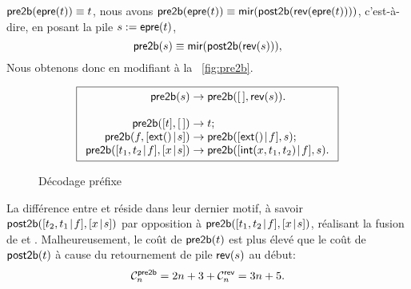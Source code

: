 \(\textsf{pre2b}(\textsf{epre}(t)) \equiv t\), nous avons
\(\textsf{pre2b}(\textsf{epre}(t)) \equiv
\textsf{mir}(\textsf{post2b}(\textsf{rev}(\textsf{epre}(t))))\), c'est-à-dire, en
posant la pile \(s := \textsf{epre}(t)\),
\begin{equation*}
\abovedisplayskip=7pt
\belowdisplayskip=7pt
\fun{pre2b}(s) \equiv \fun{mir}(\fun{post2b}(\fun{rev}(s))),
\end{equation*}
Nous obtenons donc
 en modifiant
 à la
\fig~\vref{fig:pre2b}.
\begin{figure}
\begin{equation*}
\boxed{
\begin{array}{r@{\;}c@{\;}l}
\fun{pre2b}(s) & \rightarrow & \fun{pre2b}(\el,\fun{rev}(s)).\\
\\
\fun{pre2b}([t],\el) & \rightarrow & t;\\
\fun{pre2b}(f,\cons{\fun{ext}()}{s}) & \rightarrow & \fun{pre2b}(\cons{\fun{ext}()}{f},s);\\
\fun{pre2b}(\cons{t_1,t_2}{f},\cons{x}{s}) & \rightarrow &
\fun{pre2b}(\cons{\fun{int}(x,t_1,t_2)}{f},s).
\end{array}}
\end{equation*}
\caption{Décodage préfixe}
\label{fig:pre2b}
\end{figure}
La différence entre  et
 réside dans leur dernier
motif, à savoir \(\textsf{post2b}([{t_2,t_1}\!\mid\!{f}],[{x}\!\mid\!{s}])\) par
opposition à \(\textsf{pre2b}([{t_1,t_2}\!\mid\!{f}],[{x}\!\mid\!{s}])\), réalisant
la fusion de  et . Malheureusement, le coût
de \(\textsf{pre2b}(t)\)  est plus élevé que
le coût de \(\textsf{post2b}(t)\) à cause du retournement de pile
\(\textsf{rev}(s)\) au début:
\begin{equation*}
  \C{\fun{pre2b}}{n} = 2n + 3 + \C{\fun{rev}}{n} = 3n + 5.
  \index{pre2b@$\C{\fun{pre2b}}{n}$}\index{rev@$\C{\fun{rev}}{n}$}
\end{equation*}

